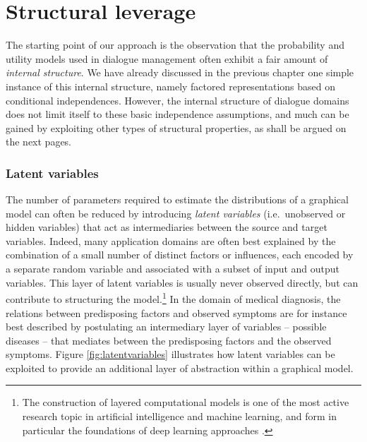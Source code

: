 \section{Structural leverage}
\label{sec:rmotivation}

The starting point of our approach is the observation that the probability and utility models used in dialogue management often exhibit a fair amount of \textit{internal structure}.  
We have already discussed in the previous chapter one simple instance of this internal structure, namely factored representations based on conditional independences. However, the internal structure of dialogue domains does not limit itself to these basic independence assumptions, and much can be gained by exploiting other types of structural properties, as shall be argued on the next pages. 



\subsubsection*{Latent variables}
 
The number of parameters required to estimate the distributions of a graphical model can often be reduced by introducing \textit{latent variables} (i.e.\ unobserved or hidden variables) that act as intermediaries between the source and target variables. Indeed, many application domains are often best explained by the combination of a small number of distinct factors or influences, each encoded by a separate random variable and associated with a subset of input and output variables. This layer of latent variables is usually never observed directly, but can contribute to structuring the model.\footnote{The construction of layered computational models is one of the most active research topic in artificial intelligence and machine learning, and form in particular the foundations of deep learning approaches \citep{Bengio:2009}.} In the domain of medical diagnosis, the relations between predisposing factors and observed symptoms are for instance best described by postulating an intermediary layer of variables -- possible diseases -- that mediates between the predisposing factors and the observed symptoms.  Figure \ref{fig:latentvariables} illustrates how latent variables can be exploited to provide an additional layer of abstraction within a graphical model.

